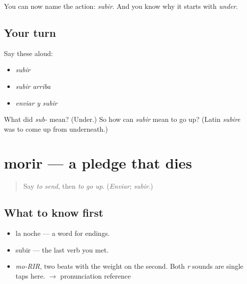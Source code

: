 \begin{grammarlens}[title={What you've built}]
You can now name the action: \emph{subir}. And you know why it starts with \emph{under}.
\end{grammarlens}

\subsection*{Your turn}
Say these aloud:

\begin{itemize}
\raggedright
  \item \emph{subir}
  \item \emph{subir arriba}
  \item \emph{enviar y subir}
\end{itemize}

\begin{tcolorbox}[breakable,colback=teal!4,colframe=teal!35!black,title={Before you move on}]
What did \emph{sub-} mean? (Under.) So how can \emph{subir} mean to go up? (Latin \emph{subire} was to come up from underneath.)
\end{tcolorbox}
\section[morir]{morir — a pledge that dies}

\label{lesson:ES-C384-morir}



\begin{quote}
Say \emph{to send}, then \emph{to go up}. (\emph{Enviar}; \emph{subir}.)
\end{quote}

\subsection*{What to know first}
\begin{itemize}
\raggedright
  \item la noche — a word for endings.
  \item subir — the last verb you met.
\end{itemize}

\begin{sounds}
\begin{itemize}
\raggedright
  \item \emph{mo-RIR}, two beats with the weight on the second. Both \emph{r} sounds are single taps here. $\to$ pronunciation reference
\end{itemize}
\end{sounds}

